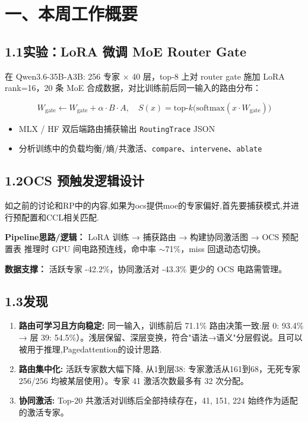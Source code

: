 \documentclass{sjtuweekly}
\begin{document}
\makeweeklytitle

\section{一、本周工作概要}

\subsection*{1.1\quad 实验：LoRA 微调 MoE Router Gate}

在 Qwen3.6-35B-A3B: 256 专家 × 40 层，top-8 上对 router gate 施加 LoRA rank=16，20 条 MoE 合成数据，对比训练前后同一输入的路由分布：

\begin{equation}
  W_{\text{gate}} \leftarrow W_{\text{gate}} + \alpha \cdot B \cdot A,\quad
  S(x) = \text{top-}k\big(\text{softmax}(x \cdot W_{\text{gate}})\big)
  \label{eq:lora_gate}
\end{equation}

\begin{itemize}
  \item MLX / HF 双后端路由捕获输出 \texttt{RoutingTrace} JSON
  \item 分析训练中的负载均衡/熵/共激活、\texttt{compare}、\texttt{intervene}、\texttt{ablate}
\end{itemize}


\subsection*{1.2\quad OCS 预触发逻辑设计}
如之前的讨论和RP中的内容,如果为ocs提供moe的专家偏好,首先要捕获模式,并进行预配置和CCL相关匹配.

\textbf{Pipeline思路/逻辑：} LoRA 训练 → 捕获路由 → 构建协同激活图 → OCS 预配置表 推理时 GPU 间电路预连线，命中率 $\sim$71\%，miss 回退动态切换。

\textbf{数据支撑：} 活跃专家 -42.2\%，协同激活对 -43.3\% 更少的 OCS 电路需管理。


\subsection*{1.3\quad 发现}

\begin{enumerate}
  \item \textbf{路由可学习且方向稳定:} 同一输入，训练前后 71.1\% 路由决策一致:层 0: 93.4\% → 层 39: 54.5\%）。浅层保留、深层变换，符合"语法→语义"分层假说。且可以被用于推理,Pagedattention的设计思路.
  \item \textbf{路由集中化:} 活跃专家数大幅下降, 从1到层38: 专家激活从161到68，无死专家256/256 均被某层使用）。专家 41 激活次数最多有 32 次分配。
  \item \textbf{协同激活:} Top-20 共激活对训练后全部持续存在，41, 151, 224 始终作为适配的激活专家。

\end{enumerate}
\end{document}
